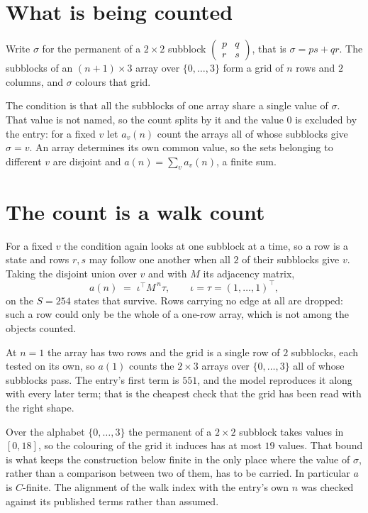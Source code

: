 \documentclass[11pt,a4paper]{article}
\theoremstyle{plain}
\theoremstyle{definition}
\begin{document}
\section{What is being counted}

Write $\sigma$ for the permanent of a $2\times2$ subblock
$\begin{pmatrix}p&q\\r&s\end{pmatrix}$, that is $\sigma=ps+qr$. The subblocks of an
$(n+1)\times3$ array over $\{0,\dots,3\}$ form a grid of $n$ rows and $2$
columns, and $\sigma$ colours that grid.

The condition is that all the subblocks of one array share a single value of $\sigma$. That
value is not named, so the count splits by it and the value $0$ is excluded by the entry: for a fixed $v$ let $a_v(n)$ count the
arrays all of whose subblocks give $\sigma=v$. An array determines its own common value, so
the sets belonging to different $v$ are disjoint and $a(n)=\sum_v a_v(n)$, a finite sum.

\section{The count is a walk count}

For a fixed $v$ the condition again looks at one subblock at a time, so a
row is a state and rows $r,s$ may follow one another when all $2$ of their subblocks give
$v$. Taking the disjoint union over $v$ and with $M$ its adjacency matrix,
\[
a(n)\;=\;\iota^{\!\top}M^{\,n}\tau,\qquad\iota=\tau=(1,\dots,1)^{\!\top},
\]
on the $S=254$ states that survive. Rows carrying no edge at all are dropped: such a row could
only be the whole of a one-row array, which is not among the objects counted.

At $n=1$ the array has two rows and the grid is a single row of $2$
subblocks, each tested on its own, so $a(1)$ counts the
$2\times3$ arrays over $\{0,\dots,3\}$ all of whose subblocks pass. The entry's
first term is $551$, and the model reproduces it along with every later term; that is the
cheapest check that the grid has been read with the right shape.

Over the alphabet $\{0,\dots,3\}$ the permanent of a $2\times2$ subblock takes values in
$[0,18]$, so the colouring of the grid it induces has at most $19$ values.
That bound is what keeps the construction below finite in the only place where the value of
$\sigma$, rather than a comparison between two of them, has to be carried.
In particular $a$ is $C$-finite. The alignment of the walk index with the entry's own $n$ was
checked against its published terms rather than assumed.
\end{document}
